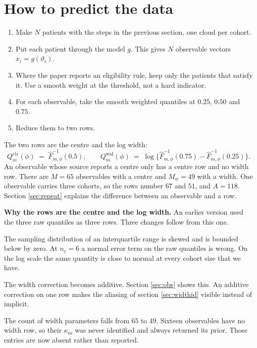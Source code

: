 \documentclass[11pt]{article}
\newcommand{\ctr}{\mathrm{ctr}}
\newcommand{\wid}{\mathrm{wid}}
\begin{document}
\section{How to predict the data}

\begin{enumerate}
\item Make $N$ patients with the steps in the previous section, one cloud per
      cohort.
\item Put each patient through the model $g$. This gives $N$ observable vectors
      $x_i=g(\vartheta_i)$.
\item Where the paper reports an eligibility rule, keep only the patients that
      satisfy it. Use a smooth weight at the threshold, not a hard indicator.
\item For each observable, take the smooth weighted quantiles at $0.25$, $0.50$
      and $0.75$.
\item Reduce them to two rows.
\end{enumerate}

The two rows are the centre and the log width:
\begin{equation}
Q^\ctr_m(\phi) \;=\; \widehat F^{-1}_{m,\phi}(0.5),
\qquad
Q^\wid_m(\phi) \;=\; \log\big\{\widehat F^{-1}_{m,\phi}(0.75)-\widehat
F^{-1}_{m,\phi}(0.25)\big\}.
\label{eq:Q}
\end{equation}
An observable whose source reports a centre only has a centre row and no width
row. There are $M=65$ observables with a centre and $M_w=49$ with a width. One
observable carries three cohorts, so the rows number $67$ and $51$, and $A=118$.
Section \ref{sec:repeat} explains the difference between an observable and a
row.

\begin{notebox}
\textbf{Why the rows are the centre and the log width.} An earlier version used
the three raw quantiles as three rows. Three changes follow from this one.

The sampling distribution of an interquartile range is skewed and is bounded
below by zero. At $n_c=6$ a normal error term on the raw quantiles is wrong. On
the log scale the same quantity is close to normal at every cohort size that we
have.

The width correction becomes additive. Section \ref{sec:obs} shows this. An
additive correction on one row makes the aliasing of section \ref{sec:widthid}
visible instead of implicit.

The count of width parameters falls from $65$ to $49$. Sixteen observables have
no width row, so their $\kappa_m$ was never identified and always returned its
prior. Those entries are now absent rather than reported.
\end{notebox}
\end{document}
